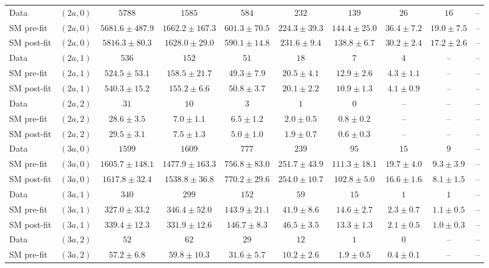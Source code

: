 \begin{table}[h!]
{\begin{tabular}{lccccccccc}
 Data & $(2a,0)$ & $5788$ & $1585$ & $584$ & $232$ & $139$ & $26$ & $16$ & -- \\[0.5ex]
 SM pre-fit & $(2a,0)$ & $5681.6\pm487.9$ & $1662.2\pm167.3$ & $601.3\pm70.5$ & $224.3\pm39.3$ & $144.4\pm25.0$ & $36.4\pm7.2$ & $19.0\pm7.5$ & -- \\[0.5ex]
 SM post-fit & $(2a,0)$ & $5816.3\pm80.3$ & $1628.0\pm29.0$ & $590.1\pm14.8$ & $231.6\pm9.4$ & $138.8\pm6.7$ & $30.2\pm2.4$ & $17.2\pm2.6$ & -- \\[0.5ex]
 Data & $(2a,1)$ & $536$ & $152$ & $51$ & $18$ & $7$ & $4$ & -- & -- \\[0.5ex]
 SM pre-fit & $(2a,1)$ & $524.5\pm53.1$ & $158.5\pm21.7$ & $49.3\pm7.9$ & $20.5\pm4.1$ & $12.9\pm2.6$ & $4.3\pm1.1$ & -- & -- \\[0.5ex]
 SM post-fit & $(2a,1)$ & $540.3\pm15.2$ & $155.2\pm6.6$ & $50.8\pm3.7$ & $20.1\pm2.2$ & $10.9\pm1.3$ & $4.1\pm0.9$ & -- & -- \\[0.5ex]
 Data & $(2a,2)$ & $31$ & $10$ & $3$ & $1$ & $0$ & -- & -- & -- \\[0.5ex]
 SM pre-fit & $(2a,2)$ & $28.6\pm3.5$ & $7.0\pm1.1$ & $6.5\pm1.2$ & $2.0\pm0.5$ & $0.8\pm0.2$ & -- & -- & -- \\[0.5ex]
 SM post-fit & $(2a,2)$ & $29.5\pm3.1$ & $7.5\pm1.3$ & $5.0\pm1.0$ & $1.9\pm0.7$ & $0.6\pm0.3$ & -- & -- & -- \\[0.5ex]
 Data & $(3a,0)$ & $1599$ & $1609$ & $777$ & $239$ & $95$ & $15$ & $9$ & -- \\[0.5ex]
 SM pre-fit & $(3a,0)$ & $1605.7\pm148.1$ & $1477.9\pm163.3$ & $756.8\pm83.0$ & $251.7\pm43.9$ & $111.3\pm18.1$ & $19.7\pm4.0$ & $9.3\pm3.9$ & -- \\[0.5ex]
 SM post-fit & $(3a,0)$ & $1617.8\pm32.4$ & $1538.8\pm36.8$ & $770.2\pm29.6$ & $254.0\pm10.7$ & $102.8\pm5.0$ & $16.6\pm1.6$ & $8.1\pm1.5$ & -- \\[0.5ex]
 Data & $(3a,1)$ & $340$ & $299$ & $152$ & $59$ & $15$ & $1$ & $1$ & -- \\[0.5ex]
 SM pre-fit & $(3a,1)$ & $327.0\pm33.2$ & $346.4\pm52.0$ & $143.9\pm21.1$ & $41.9\pm8.6$ & $14.6\pm2.7$ & $2.3\pm0.7$ & $1.1\pm0.5$ & -- \\[0.5ex]
 SM post-fit & $(3a,1)$ & $339.4\pm12.3$ & $331.9\pm12.6$ & $146.7\pm8.3$ & $46.5\pm3.5$ & $13.3\pm1.3$ & $2.1\pm0.5$ & $1.0\pm0.3$ & -- \\[0.5ex]
 Data & $(3a,2)$ & $52$ & $62$ & $29$ & $12$ & $1$ & $0$ & -- & -- \\[0.5ex]
 SM pre-fit & $(3a,2)$ & $57.2\pm6.8$ & $59.8\pm10.3$ & $31.6\pm5.7$ & $10.2\pm2.6$ & $1.9\pm0.5$ & $0.4\pm0.1$ & -- & -- \\[0.5ex]

\end{tabular}}
\end{table}

